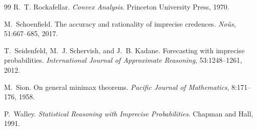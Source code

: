 \documentclass[11pt]{article}
\theoremstyle{plain}
\theoremstyle{definition}
\theoremstyle{remark}
\begin{document}
\begin{thebibliography}{99}
R.~T. Rockafellar.
\newblock \emph{Convex Analysis}.
\newblock Princeton University Press, 1970.

M.~Schoenfield.
\newblock The accuracy and rationality of imprecise credences.
\newblock \emph{No\^us}, 51:667--685, 2017.

T.~Seidenfeld, M.~J. Schervish, and J.~B. Kadane.
\newblock Forecasting with imprecise probabilities.
\newblock \emph{International Journal of Approximate Reasoning}, 53:1248--1261, 2012.

M.~Sion.
\newblock On general minimax theorems.
\newblock \emph{Pacific Journal of Mathematics}, 8:171--176, 1958.

P.~Walley.
\newblock \emph{Statistical Reasoning with Imprecise Probabilities}.
\newblock Chapman and Hall, 1991.

\end{thebibliography}
\end{document}
